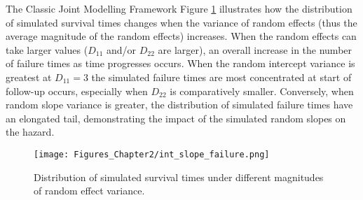 \begin{chapter}{\label{cha:methods-classic}The Classic Joint Modelling Framework}
  Figure \ref{fig:sim-intslope} illustrates how the distribution of simulated survival times changes when the variance of random effects (thus the average magnitude of the random effects) increases. When the random effects can take larger values (\ie $D_{11}$ and/or $D_{22}$ are larger), an overall increase in the number of failure times as time progresses occurs. When the random intercept variance is greatest at $D_{11}=3$ the simulated failure times are most concentrated at start of follow-up occurs, especially when $D_{22}$ is comparatively smaller. Conversely, when random slope variance is greater, the distribution of simulated failure times have an elongated tail, demonstrating the impact of the simulated random slopes on the hazard.
  \begin{figure}[t]
    \centering
    \texttt{[image: Figures\_Chapter2/int\_slope\_failure.png]}
    \caption{Distribution of simulated survival times under different magnitudes of random effect variance.}
  \label{fig:sim-intslope}
  \end{figure}

\end{chapter}